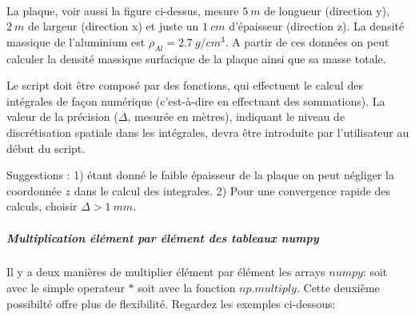 \documentclass{article}
\begin{document}
    \begin{center}
    \end{center}
    { \hspace*{\fill} \\}
    

    La plaque, voir aussi la figure ci-dessus, mesure \(5\ m\) de longueur
(direction y), \(2\ m\) de largeur (direction x) et juste un \(1 \ cm\)
d'épaisseur (direction z). La densité massique de l'aluminium est
\(\rho_{Al} = 2.7 \ g / cm^{3}\). A partir de ces données on peut
calculer la densité massique surfacique de la plaque ainsi que sa masse
totale.

Le script doit être composé par des fonctions, qui effectuent le calcul
des intégrales de façon numérique (c'est-à-dire en effectuant des
sommations). La valeur de la précision (\(\Delta\), mesurée en mètres),
indiquant le niveau de discrétisation spatiale dans les intégrales,
devra être introduite par l'utilisateur au début du script.

Suggestions : 1) étant donné le faible épaisseur de la plaque on peut
négliger la coordonnée \(z\) dans le calcul des integrales. 2) Pour une
convergence rapide des calculs, choisir \(\Delta > 1\ mm\).


    \subparagraph{Multiplication élément par élément des tableaux numpy}


    Il y a deux manières de multiplier élément par élément les arrays
\(numpy\): soit avec le simple operateur \(*\) soit avec la fonction
\(np.multiply\). Cette deuxième possibilté offre plus de flexibilité.
Regardez les exemples ci-dessous:
\end{document}

